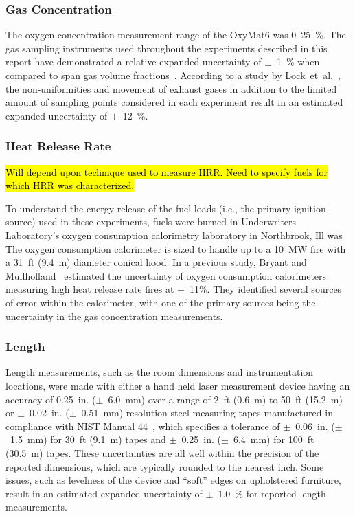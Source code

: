 \documentclass[12pt,oneside]{book}
\begin{document}
\subsubsection*{Gas Concentration}
The oxygen concentration measurement range of the OxyMat6 was 0--25~\%. The gas sampling instruments used throughout the experiments described in this report have demonstrated a relative expanded uncertainty of $\pm$~1~\% when compared to span gas volume fractions~\cite{Bundy:2007}. According to a study by Lock~et~al.~\cite{Lock:1}, the non-uniformities and movement of exhaust gases in addition to the limited amount of sampling points considered in each experiment result in an estimated expanded uncertainty of $\pm$~12~\%.

\subsubsection*{Heat Release Rate}
\hl{Will depend upon technique used to measure HRR. Need to specify fuels for which HRR was characterized.} 

To understand the energy release of the fuel loads (i.e., the primary ignition source) used in these experiments, fuels were burned in Underwriters Laboratory's oxygen consumption calorimetry laboratory in Northbrook, Ill was The oxygen consumption calorimeter is sized to handle up to a 10~MW fire with a 31~ft (9.4~m) diameter conical hood. In a previous study, Bryant and Mullholland~\cite{Bryant:FM2008} estimated the uncertainty of oxygen consumption calorimeters measuring high heat release rate fires at $\pm$~11\%. They identified several sources of error within the calorimeter, with one of the primary sources being the uncertainty in the gas concentration measurements.

\subsubsection*{Length}
Length measurements, such as the room dimensions and instrumentation locations, were made with either a hand held laser measurement device having an accuracy of 0.25~in. ($\pm$~6.0~mm) over a range of 2~ft (0.6~m) to 50~ft (15.2~m)~\cite{StanleyTools} or $\pm$~0.02~in. ($\pm$~0.51~mm) resolution steel measuring tapes manufactured in compliance with NIST Manual 44~\cite{Butcher:2012}, which specifies a tolerance of $\pm$~0.06~in. ($\pm$~1.5~mm) for 30~ft (9.1~m) tapes and $\pm$~0.25~in. ($\pm$~6.4~mm) for 100~ft (30.5~m) tapes. These uncertainties are all well within the precision of the reported dimensions, which are typically rounded to the nearest inch. Some issues, such as levelness of the device and ``soft'' edges on upholstered furniture, result in an estimated expanded uncertainty of $\pm$~1.0~\% for reported length measurements.
\end{document}
